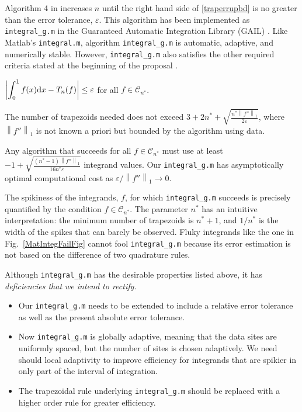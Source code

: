 \documentclass[11pt]{NSFamsart}
\def\dif{\textup{d}}
\newcommand{\cc}{\mathcal{C}}
\def\abs#1{\ensuremath{\left \lvert #1 \right \rvert}}
\newcommand{\norm}[2][{}]{\ensuremath{\left \lVert #2 \right \rVert}_{#1}}
\newcommand{\Matlab}{{\sc Matlab}\xspace}
\begin{document}
Algorithm 4 in \cite{HicEtal14b} increases $n$ until the right hand side of \eqref{traperrupbd} is no greater than the error tolerance, $\varepsilon$.  This algorithm has been implemented as {\tt integral\_g.m} in the Guaranteed Automatic Integration Library (GAIL) \citep{ChoEtal14a}.  Like \Matlab's {\tt integral.m}, algorithm {\tt integral\_g.m} is automatic, adaptive, and numerically stable.  However, {\tt integral\_g.m} also satisfies the other required criteria stated at the beginning of the proposal \citep{HicEtal14b}.
\begin{description}[leftmargin=2.5ex]
\item[Guarantee] $\displaystyle \abs{\int_0^1 f(x) \dif x - T_n(f)} \le \varepsilon$ for all $f \in \cc_{n^*}$.
\item[Computational Cost Upper Bound] The number of trapezoids needed does not exceed $\displaystyle 3+2n^*+\sqrt{\frac{n^* \norm[1]{f''}}{2 \varepsilon}}$, where $\norm[1]{f''}$ is not known a priori but bounded by the algorithm using data.
\item[Complexity Lower Bound] Any algorithm that succeeds for all $f \in \cc_{n^*}$ must use at least $\displaystyle -1 + \sqrt{\frac{(n^* - 1) \norm[1]{f''}}{16 n^* \varepsilon}}$ integrand values.  Our {\tt integral\_g.m} has asymptotically optimal computational cost as $\varepsilon/\norm[1]{f''} \to 0$.
\end{description}

The spikiness of the integrands, $f$, for which {\tt integral\_g.m} succeeds is precisely quantified by the condition $f \in \cc_{n^*}$. The parameter $n^*$ has an intuitive interpretation:  the minimum number of trapezoids is $n^*+1$, and $1/n^*$ is the width of the spikes that can barely be observed.  Fluky integrands like the one in Fig.\ \ref{MatIntegFailFig} cannot fool {\tt integral\_g.m} because its error estimation is not based on the difference of two quadrature rules.

Although {\tt integral\_g.m} has the desirable properties listed above, it has \emph{deficiencies that we intend to rectify.}
\begin{itemize}[leftmargin=2.5ex]
\item Our {\tt integral\_g.m} needs to be extended to include a relative error tolerance as well as the present absolute error tolerance.

\item Now {\tt integral\_g.m} is globally adaptive, meaning that the data sites are uniformly spaced, but the number of sites is chosen adaptively.  We need should local adaptivity to improve efficiency for integrands that are spikier in only part of the interval of integration.

\item The trapezoidal rule underlying {\tt integral\_g.m} should be replaced with a higher order rule for greater efficiency.
\end{itemize}
\end{document}
